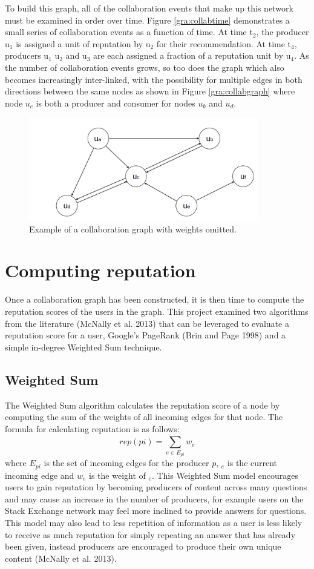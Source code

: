 \documentclass[]{final_report}
\begin{document}
To build this graph, all of the collaboration events that make up this network must be examined in order over time. Figure \ref{gra:collabtime} demonstrates a small series of collaboration events as a function of time. At time t$_{2}$, the producer u$_{1}$ is assigned a unit of reputation by u$_{2}$ for their recommendation. At time t$_{4}$, producers u$_{1}$ u$_{2}$ and u$_{3}$ are each assigned a fraction of a reputation unit by u$_{4}$. As the number of collaboration events grows, so too does the graph which also becomes increasingly inter-linked, with the possibility for multiple edges in both directions between the same nodes as shown in Figure \ref{gra:collabgraph} where node $u_{c}$ is both a producer and consumer for nodes $u_{b}$ and $u_{d}$.

\begin{figure}[ht!]
\centering
\includegraphics[width=100mm]{chap3/collabgraph.png}
\caption{Example of a collaboration graph with weights omitted.}
\end{figure}\label{gra:collabgraph}

\section{Computing reputation}

Once a collaboration graph has been constructed, it is then time to compute the reputation scores of the users in the graph. This project examined two algorithms from the literature (McNally et al. 2013) that can be leveraged to evaluate a reputation score for a user, Google's PageRank (Brin and Page 1998) and a simple in-degree Weighted Sum technique.

\subsection{Weighted Sum}

The Weighted Sum algorithm calculates the reputation score of a node by computing the sum of the weights of all incoming edges for that node. The formula for calculating reputation is as follows:
\[
rep(pi) = \sum_{e\in E_{pi}}^{} w_{e} 
\]
where $E_{pi}$ is the set of incoming edges for the producer $p$, $_{e}$ is the current incoming edge and $w_{e}$ is the weight of $_{e}$. This Weighted Sum model encourages users to gain reputation by becoming producers of content across many questions and may cause an increase in the number of producers, for example users on the Stack Exchange network may feel more inclined to provide answers for questions. This model may also lead to less repetition of information as a user is less likely to receive as much reputation for simply repeating an answer that has already been given, instead producers are encouraged to produce their own unique content (McNally et al. 2013).
\end{document}
